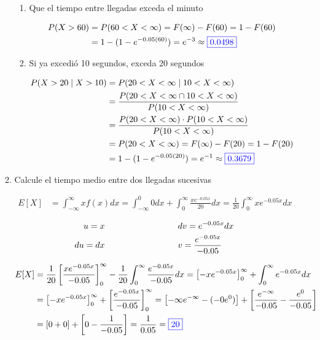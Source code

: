 \documentclass[12pt]{report}
\begin{document}
\begin{enumerate}
\begin{enumerate}[label=\alph*.]
    \begin{enumerate}[label=\alph*)]
      \item Que el tiempo entre llegadas exceda el minuto
      
      \begin{align*}
        P(X > 60) &= P(60 < X < \infty) = F(\infty) - F(60) = 1 - F(60) \\
        &= 1 - (1 - e^{-0.05(60)}) = e^{-3} \approx {\color{blue}\boxed{0.0498}}
      \end{align*}

      \item Si ya excedió 10 segundos, exceda 20 segundos
      
      \begin{align*}
        P(X > 20 \mid X > 10) &= P(20 < X < \infty \mid 10 < X < \infty) \\ 
        &= \frac{P(20 < X < \infty \cap 10 < X < \infty)}{P(10 < X < \infty)} \\
        &= \frac{P(20 < X < \infty) \cdot P(10 < X < \infty)}{P(10 < X < \infty)} \\
        &= P(20 < X < \infty) = F(\infty) - F(20) = 1 - F(20) \\
        &= 1 - (1 - e^{-0.05(20)}) = e^{-1} \approx {\color{blue}\boxed{0.3679}}
      \end{align*}
    \end{enumerate}

    \item Calcule el tiempo medio entre dos llegadas sucesivas

    \begin{align*}
      E[X] &= \int_{-\infty}^{\infty} xf(x)dx = \int_{-\infty}^0 0dx + \int_0^{\infty} \frac{xe^{-0.05x}}{20} dx = \frac{1}{20} \int_0^{\infty} xe^{-0.05x} dx 
    \end{align*}

    \begin{align*}
      u = x \hspace*{3cm} & dv = e^{-0.05x} dx \\
      du = dx \hspace*{3cm} & v = \frac{e^{-0.05x}}{-0.05} 
    \end{align*}

    \begin{align*}
      E[X] &= \frac{1}{20} \left[ \frac{xe^{-0.05x}}{-0.05} \right]_0^{\infty} - \frac{1}{20} \int_0^{\infty} \frac{e^{-0.05x}}{-0.05} dx = \left[ -xe^{-0.05x} \right]_0^\infty + \int_0^\infty e^{-0.05x} dx \\ 
      &= \left[ -xe^{-0.05x} \right]_0^\infty + \left[ \frac{e^{-0.05x}}{-0.05} \right]_0^\infty = \left[ -\infty e^{-\infty} - (-0e^0) \right] + \left[ \frac{e^{-\infty}}{-0.05} - \frac{e^0}{-0.05} \right] \\
      &= \left[ 0 + 0 \right] + \left[ 0 - \frac{1}{-0.05} \right] = \frac{1}{0.05} = {\color{blue}\boxed{20}}
    \end{align*}


\end{enumerate}
\end{enumerate}
\end{document}
